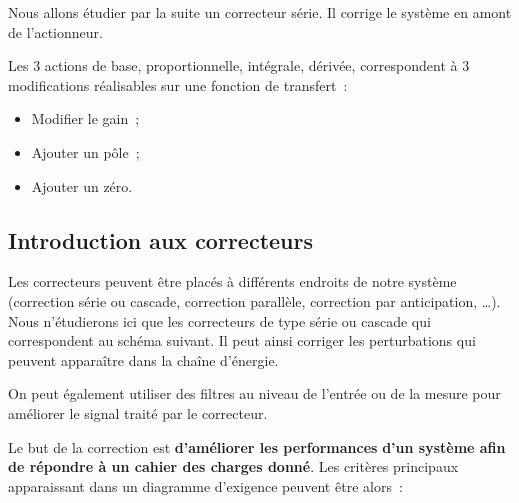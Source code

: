 Nous allons étudier par la suite un correcteur série. Il corrige le système en amont de l'actionneur.

Les 3 actions de base, proportionnelle, intégrale, dérivée, correspondent à 3 modifications réalisables sur une fonction de transfert~:

\begin{itemize}
\item
  Modifier le gain~;
\item
  Ajouter un pôle~;
\item
  Ajouter un zéro.
\end{itemize}

\hypertarget{introduction-aux-correcteurs}{%
\subsection{Introduction aux correcteurs}\label{introduction-aux-correcteurs}}

\TLCorrecteurSerie


Les correcteurs peuvent être placés à différents endroits de notre système (correction série ou cascade, correction parallèle, correction par anticipation, \ldots). Nous n'étudierons ici que les correcteurs de type série ou cascade qui correspondent au schéma suivant. Il peut ainsi corriger les perturbations qui peuvent apparaître dans la chaîne d'énergie.

On peut également utiliser des filtres au niveau de l'entrée ou de la mesure pour améliorer le signal traité par le correcteur.

Le but de la correction est \textbf{d'améliorer les performances} \textbf{d'un système afin de répondre à un cahier des charges donné}. Les critères principaux apparaissant dans un diagramme d'exigence peuvent être alors~:


